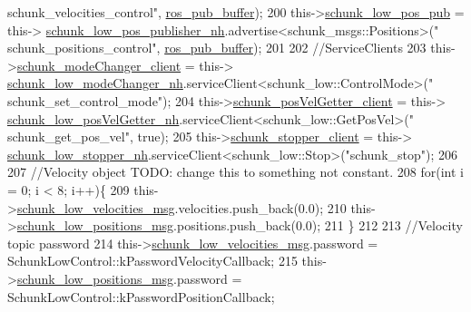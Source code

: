 \begin{DoxyCode}
{      schunk\_velocities\_control"}, \hyperlink{classCartesian__controller_ab9ed5a808da204dbc612d313dc7332f4}{ros\_pub\_buffer});
200         this->\hyperlink{classCartesian__controller_af06313084ef058d1f979fddeb33d5100}{schunk\_low\_pos\_pub}                   = this->
      \hyperlink{classCartesian__controller_aabe48e7ab08b0235d4cd94213b8faf5d}{schunk\_low\_pos\_publisher\_nh}.advertise<schunk\_msgs::Positions>(\textcolor{stringliteral}{"
      schunk\_positions\_control"}, \hyperlink{classCartesian__controller_ab9ed5a808da204dbc612d313dc7332f4}{ros\_pub\_buffer});
201 
202         \textcolor{comment}{//ServiceClients}
203         this->\hyperlink{classCartesian__controller_aee1fc445b64c534847ff0012132a5d2c}{schunk\_modeChanger\_client}               = this->
      \hyperlink{classCartesian__controller_ad90134b232217e84cb58137a9d2030bb}{schunk\_low\_modeChanger\_nh}.serviceClient<schunk\_low::ControlMode>(\textcolor{stringliteral}{"
      schunk\_set\_control\_mode"});
204         this->\hyperlink{classCartesian__controller_a5c1d9386bc5f219f2edc0d5d1b21f0da}{schunk\_posVelGetter\_client}             = this->
      \hyperlink{classCartesian__controller_aeed01809bd5240663c7acfade245a386}{schunk\_low\_posVelGetter\_nh}.serviceClient<schunk\_low::GetPosVel>(\textcolor{stringliteral}{"
      schunk\_get\_pos\_vel"}, \textcolor{keyword}{true});
205         this->\hyperlink{classCartesian__controller_a4ea7350e0f797c49bc51d3433a761aff}{schunk\_stopper\_client}                = this->
      \hyperlink{classCartesian__controller_a57b1869ec960e75e435e1f882a02d80e}{schunk\_low\_stopper\_nh}.serviceClient<schunk\_low::Stop>(\textcolor{stringliteral}{"schunk\_stop"});
206 
207         \textcolor{comment}{//Velocity object TODO: change this to something not constant.}
208         \textcolor{keywordflow}{for}(\textcolor{keywordtype}{int} i = 0; i < 8; i++)\{
209                 this->\hyperlink{classCartesian__controller_af59178c57bdd73d9eb474577247bbe40}{schunk\_low\_velocities\_msg}.velocities.push\_back(0.0);
210                 this->\hyperlink{classCartesian__controller_a2dd700542bd6243eef10d34811055584}{schunk\_low\_positions\_msg}.positions.push\_back(0.0);
211         \}
212 
213         \textcolor{comment}{//Velocity topic password}
214         this->\hyperlink{classCartesian__controller_af59178c57bdd73d9eb474577247bbe40}{schunk\_low\_velocities\_msg}.password = 
      SchunkLowControl::kPasswordVelocityCallback;
215         this->\hyperlink{classCartesian__controller_a2dd700542bd6243eef10d34811055584}{schunk\_low\_positions\_msg}.password  = 
      SchunkLowControl::kPasswordPositionCallback;

\end{DoxyCode}
